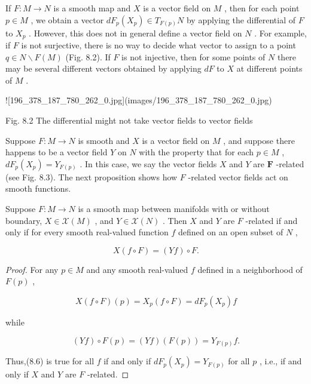\begin{definition}
\label{def:8-57-extra-1}
\leanok
If $F : M \rightarrow  N$ is a smooth map and $X$ is a vector field on $M$ , then for each point $p \in  M$ , we obtain a vector $d{F}_{p}\left( {X}_{p}\right)  \in  {T}_{F\left( p\right) }N$ by applying the differential of $F$ to ${X}_{p}$ . However, this does not in general define a vector field on $N$ . For example, if $F$ is not surjective, there is no way to decide what vector to assign to a point $q \in  N \smallsetminus  F\left( M\right)$ (Fig. 8.2). If $F$ is not injective, then for some points of $N$ there may be several different vectors obtained by applying ${dF}$ to $X$ at different points of $M$ .

![196_378_187_780_262_0.jpg](images/196_378_187_780_262_0.jpg)

Fig. 8.2 The differential might not take vector fields to vector fields

Suppose $F : M \rightarrow  N$ is smooth and $X$ is a vector field on $M$ , and suppose there happens to be a vector field $Y$ on $N$ with the property that for each $p \in  M$ , $d{F}_{p}\left( {X}_{p}\right)  = {Y}_{F\left( p\right) }$ . In this case, we say the vector fields $X$ and $Y$ are $\mathbf{F}$ -related (see Fig. 8.3). The next proposition shows how $F$ -related vector fields act on smooth functions.
\end{definition}

\begin{proposition}
\label{prop:8-16}
\leanok
{}
Suppose $F : M \rightarrow  N$ is a smooth map between manifolds with or without boundary, $X \in  \mathcal{X}\left( M\right)$ , and $Y \in  \mathcal{X}\left( N\right)$ . Then $X$ and $Y$ are $F$ -related if and only if for every smooth real-valued function $f$ defined on an open subset of $N$ ,

\[
X\left( {f \circ  F}\right)  = \left( {Yf}\right)  \circ  F. \tag{8.6}
\]
\end{proposition}

\begin{proof}
\leanok
For any $p \in  M$ and any smooth real-valued $f$ defined in a neighborhood of $F\left( p\right)$ ,

\[
X\left( {f \circ  F}\right) \left( p\right)  = {X}_{p}\left( {f \circ  F}\right)  = d{F}_{p}\left( {X}_{p}\right) f
\]

while

\[
\left( {Yf}\right)  \circ  F\left( p\right)  = \left( {Yf}\right) \left( {F\left( p\right) }\right)  = {Y}_{F\left( p\right) }f.
\]

Thus,(8.6) is true for all $f$ if and only if $d{F}_{p}\left( {X}_{p}\right)  = {Y}_{F\left( p\right) }$ for all $p$ , i.e., if and only if $X$ and $Y$ are $F$ -related.
\end{proof}


